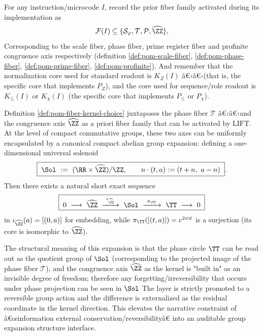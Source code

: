 \begin{definition}\label{def:pom-fiber-kernel-choice}
For any instruction/microcode $I$, record the prior fiber family activated during its implementation as
$$
\mathcal{F}(I)\subseteq \{\mathcal{S}_\varphi,\mathcal{T},\mathcal{P},\widehat{\ZZ}\},
$$
Corresponding to the scale fiber, phase fiber, prime register fiber and profinite congruence axis respectively (definition \ref{def:pom-scale-fiber}, \ref{def:pom-phase-fiber}, \ref{def:pom-prime-fiber}, \ref{def:pom-profinite}).
And remember that the normalization core used for standard readout is $K_Z(I)$ â€‹â€‹(that is, the specific core that implements $P_Z$), and the core used for sequence/role readout is $K_{\le}(I)$ or $K_{\chi}(I)$ (the specific core that implements $P_{\le}$ or $P_\chi$).
\end{definition}

\begin{remark}\label{rem:pom-solenoid-extension}
Definition \ref{def:pom-fiber-kernel-choice} juxtaposes the phase fiber \(\mathcal{T}\) â€‹â€‹and the congruence axis \(\widehat{\ZZ}\) as a priori fiber family that can be activated by \(\mathrm{LIFT}\).
At the level of compact commutative groups, these two axes can be uniformly encapsulated by a canonical compact abelian group expansion: defining a one-dimensional universal solenoid
\begin{equation}\label{eq:pom-universal-solenoid-quotient}
\boxed{\;
\Sol\ :=\ (\RR\times \widehat{\ZZ})/\ZZ,\qquad
n\cdot(t,a):=(t+n,\ a-n)\; }.
\end{equation}
Then there exists a natural short exact sequence
\begin{equation}\label{eq:pom-universal-solenoid-ses}
\boxed{\;
0\ \longrightarrow\ \widehat{\ZZ}\ \xrightarrow{\ \iota_{\widehat{\ZZ}}\ }\ \Sol\ \xrightarrow{\ \pi_{\TT}\ }\ \TT\ \longrightarrow\ 0\;}
\end{equation}
in
\(
\iota_{\widehat{\ZZ}}(a)=[(0,a)]
\)
for embedding, while
\(
\pi_{\TT}([(t,a)])=e^{2\pi \mathrm{i}t}
\)
is a surjection (its core is isomorphic to \(\widehat{\ZZ}\)).
\par
The structural meaning of this expansion is that the phase circle \(\TT\) can be read out as the quotient group of \(\Sol\) (corresponding to the projected image of the phase fiber \(\mathcal{T}\)), and the congruence axis \(\widehat{\ZZ}\) as the kernel is "built in" as an invisible degree of freedom; therefore any forgetting/irreversibility that occurs under phase projection can be seen in \(\Sol\) The layer is strictly promoted to a reversible group action and the difference is externalized as the residual coordinate in the kernel direction.
This elevates the narrative constraint of â€œinformation external conservation/reversibilityâ€ into an auditable group expansion structure interface.
\end{remark}


